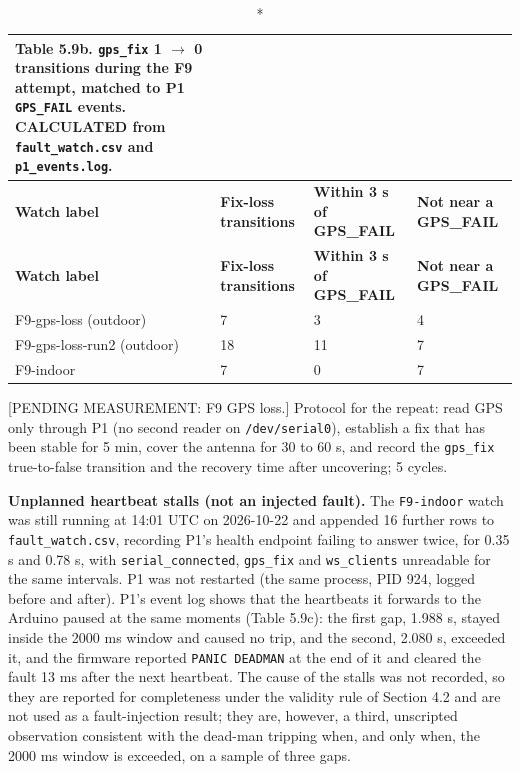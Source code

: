 \begin{center}
\footnotesize
\begin{longtable}{|p{3.3cm}|p{2.8cm}|p{3.0cm}|p{3.0cm}|}
\caption*{Table 5.9b. \texttt{gps\_fix} 1 $\rightarrow$ 0 transitions during the F9 attempt, matched to P1 \texttt{GPS\_FAIL} events. CALCULATED from \texttt{fault\_watch.csv} and \texttt{p1\_events.log}.}
\addcontentsline{lot}{table}{\protect\numberline{5.9b}\texttt{gps\_fix} 1 $\rightarrow$ 0 transitions during the F9 attempt, matched to P1 \texttt{GPS\_FAIL} events. CALCULATED from \texttt{fault\_watch.csv} and \texttt{p1\_events.log}.}
\\
\hline
\textbf{Watch label} & \textbf{Fix-loss transitions} & \textbf{Within 3 s of GPS\_FAIL} & \textbf{Not near a GPS\_FAIL} \\
\hline
\endfirsthead
\hline
\textbf{Watch label} & \textbf{Fix-loss transitions} & \textbf{Within 3 s of GPS\_FAIL} & \textbf{Not near a GPS\_FAIL} \\
\hline
\endhead
F9-gps-loss (outdoor) & 7 & 3 & 4 \\
\hline
F9-gps-loss-run2 (outdoor) & 18 & 11 & 7 \\
\hline
F9-indoor & 7 & 0 & 7 \\
\hline
\end{longtable}
\end{center}

[PENDING MEASUREMENT: F9 GPS loss.] Protocol for the repeat: read GPS only through P1 (no second reader on \texttt{/dev/serial0}), establish a fix that has been stable for 5 min, cover the antenna for 30 to 60 s, and record the \texttt{gps\_fix} true-to-false transition and the recovery time after uncovering; 5 cycles.

\textbf{Unplanned heartbeat stalls (not an injected fault).} The \texttt{F9-indoor} watch was still running at 14:01 UTC on 2026-10-22 and appended 16 further rows to \texttt{fault\_watch.csv}, recording P1's health endpoint failing to answer twice, for 0.35 s and 0.78 s, with \texttt{serial\_connected}, \texttt{gps\_fix} and \texttt{ws\_clients} unreadable for the same intervals. P1 was not restarted (the same process, PID 924, logged before and after). P1's event log shows that the heartbeats it forwards to the Arduino paused at the same moments (Table 5.9c): the first gap, 1.988 s, stayed inside the 2000 ms window and caused no trip, and the second, 2.080 s, exceeded it, and the firmware reported \texttt{PANIC DEADMAN} at the end of it and cleared the fault 13 ms after the next heartbeat. The cause of the stalls was not recorded, so they are reported for completeness under the validity rule of Section 4.2 and are not used as a fault-injection result; they are, however, a third, unscripted observation consistent with the dead-man tripping when, and only when, the 2000 ms window is exceeded, on a sample of three gaps.

